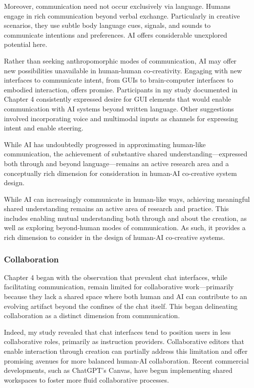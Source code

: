 Moreover, communication need not occur exclusively via language. Humans engage in rich communication beyond verbal exchange. Particularly in creative scenarios, they use subtle body language cues, signals, and sounds to communicate intentions and preferences. AI offers considerable unexplored potential here.

Rather than seeking anthropomorphic modes of communication, AI may offer new possibilities unavailable in human-human co-creativity. Engaging with new interfaces to communicate intent, from GUIs to brain-computer interfaces to embodied interaction, offers promise. Participants in my study documented in Chapter 4 consistently expressed desire for GUI elements that would enable communication with AI systems beyond written language. Other suggestions involved incorporating voice and multimodal inputs as channels for expressing intent and enable steering. 

While AI has undoubtedly progressed in approximating human-like communication, the achievement of substantive shared understanding—expressed both through and beyond language—remains an active research area and a conceptually rich dimension for consideration in human-AI co-creative system design.

While AI can increasingly communicate in human-like ways, achieving meaningful shared understanding remains an active area of research and practice. This includes enabling mutual understanding both through and about the creation, as well as exploring beyond-human modes of communication. As such, it provides a rich dimension to consider in the design of human-AI co-creative systems.

\subsubsection{Collaboration}

Chapter 4 began with the observation that prevalent chat interfaces, while facilitating communication, remain limited for collaborative work—primarily because they lack a shared space where both human and AI can contribute to an evolving artifact beyond the confines of the chat itself. This began delineating collaboration as a distinct dimension from communication. 

Indeed, my study revealed that chat interfaces tend to position users in less collaborative roles, primarily as instruction providers. Collaborative editors that enable interaction through creation can partially address this limitation and offer promising avenues for more balanced human-AI collaboration. Recent commercial developments, such as ChatGPT's Canvas, have begun implementing shared workspaces to foster more fluid collaborative processes.


